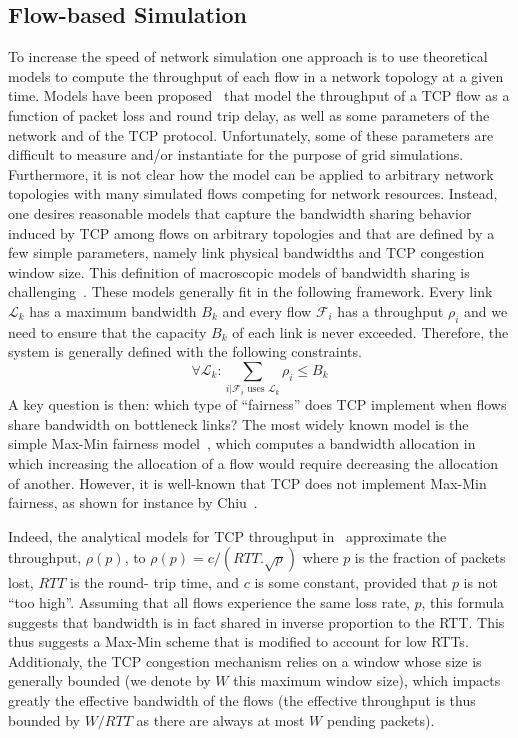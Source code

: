 \documentclass{sig-alternate}
\let\leq=\leqslant
\begin{document}
\subsection{Flow-based Simulation}
\label{sec:rel.flow}
\def\L{\ensuremath{\mathcal{L}}\xspace}%
\def\F{\ensuremath{\mathcal{F}}\xspace}%
To increase the speed of network simulation one approach is to use
theoretical models to compute the throughput of each flow in a network
topology at a given time. 
Models have been proposed~\cite{REF_26,
  REF_19, REF_24} that model the throughput of a TCP flow as a
function of packet loss and round trip delay, as well as some
parameters of the network and of the TCP protocol. Unfortunately, some
of these parameters are difficult to measure and/or instantiate for
the purpose of grid simulations. Furthermore, it is not clear how the
model can be applied to arbitrary network topologies with many
simulated flows competing for network resources. Instead, one desires
reasonable models that capture the bandwidth sharing behavior induced
by TCP among flows on arbitrary topologies and that are defined by a
few simple parameters, namely link physical bandwidths and TCP
congestion window size.  This definition of macroscopic models of
bandwidth sharing is challenging~\cite{REF_18}.
These models generally fit in the following
framework. Every link $\L_k$ has a maximum bandwidth $B_k$ and every
flow $\F_i$ has a throughput $\rho_i$ and we need to ensure that the
capacity $B_k$ of each link is never exceeded. Therefore, the system
is generally defined with the following constraints.
\begin{equation*}
  \forall \L_k: \sum_{i | \F_i \text{ uses } \L_k} \rho_i \leq B_k
\end{equation*}
A key question is then: which type of ``fairness'' does TCP implement when
flows share bandwidth on bottleneck links? 
The most widely known model is
the simple Max-Min fairness model~\cite{BG92}, which computes a
bandwidth allocation in which increasing the allocation of
a flow would require decreasing the allocation of another.
However, it is well-known that TCP does not implement
Max-Min fairness, as shown for instance by Chiu~\cite{REF_4}. 

Indeed, the analytical models for TCP throughput in~\cite{REF_8,
  REF_26} approximate the throughput, $\rho(p)$, to $\rho(p)=c/(RTT.\sqrt{p})$
where $p$ is the fraction of packets lost, $RTT$ is the round-
trip time, and $c$ is some constant, provided that $p$
is not ``too high''. Assuming that all flows experience the
same loss rate, $p$, this formula suggests that bandwidth is
in fact shared in inverse proportion to the RTT. This thus
suggests a Max-Min scheme that is modified to account for
low RTTs. 
Additionaly, the TCP congestion mechanism relies on a window whose
size is generally bounded (we denote by $W$ this maximum window size),
which impacts greatly the effective bandwidth of the flows (the
effective throughput is thus bounded by $W/RTT$ as there are always at
most $W$ pending packets).
\end{document}
